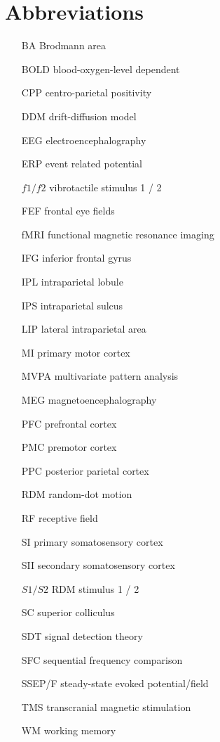 
\chapter*{Abbreviations}
\singlespacing
\begin{itemize}
\itemsep-0.3em 
\item[BA] 		Brodmann area
\item[BOLD]		blood-oxygen-level dependent
\item[CPP]		centro-parietal positivity
\item[DDM]		drift-diffusion model
\item[EEG]		electroencephalography
\item[ERP]		event related potential
\item[$f1/f2$] 	vibrotactile stimulus 1 / 2
\item[FEF]		frontal eye fields
\item[fMRI]		functional magnetic resonance imaging
\item[IFG]		inferior frontal gyrus
\item[IPL]		intraparietal lobule
\item[IPS]		intraparietal sulcus
\item[LIP]		lateral intraparietal area
\item[MI]		primary motor cortex
\item[MVPA]		multivariate pattern analysis
\item[MEG]		magnetoencephalography
\item[PFC]		prefrontal cortex
\item[PMC]		premotor cortex
\item[PPC]		posterior parietal cortex
\item[RDM]		random-dot motion
\item[RF]		receptive field
\item[SI]		primary somatosensory cortex
\item[SII]		secondary somatosensory cortex
\item[$S1/S2$]		RDM stimulus 1 / 2
\item[SC]		superior colliculus
\item[SDT]		signal detection theory
\item[SFC]		sequential frequency comparison
\item[SSEP/F]		steady-state evoked potential/field
\item[TMS]		transcranial magnetic stimulation
\item[WM]		working memory

\end{itemize}